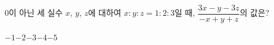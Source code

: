 \hspace*{2mm}\begin{minipage}[t]{\dimexpr\linewidth-2mm\relax}\vspace{0pt}
$0$이 아닌 세 실수 $x$, $y$, $z$에 대하여 $x:y:z=1:2:3$일 때, $\dfrac{3x-y-3z}{-x+y+z}$의 값은?
\begin{choices32}{$-1$}{$-2$}{$-3$}{$-4$}{$-5$}\end{choices32}\end{minipage}
